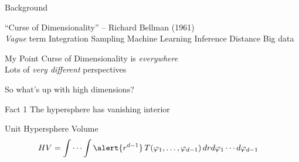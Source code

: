 \documentclass[14pt]{beamer}
\begin{document}
\begin{frame}{Background}
  \begin{outline}
  \1 ``Curse of Dimensionality'' -- Richard Bellman (1961) \\
  \1 \emph{Vague} term
    \2 Integration
    \2 Sampling
    \2 Machine Learning
    \2 Inference
    \2 Distance
    \2 Big data
  \end{outline}
\end{frame}


\begin{frame}{My Point}
  Curse of Dimensionality is \emph{everywhere} \\
  Lots of \emph{very different} perspectives

  \bigskip
  So what's up with high dimensions?
\end{frame}


\begin{frame}{Fact 1}
  The hypersphere has vanishing interior
\end{frame}

\begin{frame}{Unit Hypersphere Volume}
  \begin{equation*} \begin{aligned}
      HV &= \int\cdots\int \alert{r^{d-1}}\,
           T(\varphi_{1},\dots,\varphi_{d-1})\,
           dr d\varphi_{1}\cdots d\varphi_{d-1}
  \end{aligned} \end{equation*}
\end{frame}

\end{document}

